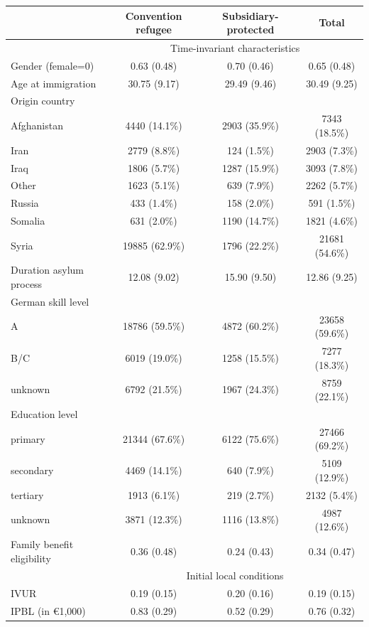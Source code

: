 \begin{tabular}{lccc}
\toprule
 & Convention refugee & Subsidiary-protected & Total \\
\midrule
\multicolumn{1}{l}{} & \multicolumn{3}{c}{Time-invariant characteristics} \\
Gender (female=0) & 0.63 (0.48) & 0.70 (0.46) & 0.65 (0.48) \\
Age at immigration & 30.75 (9.17) & 29.49 (9.46) & 30.49 (9.25) \\
Origin country & & & \\
\quad Afghanistan & 4440 (14.1\%) & 2903 (35.9\%) & 7343 (18.5\%) \\
\quad Iran & 2779 (8.8\%) & 124 (1.5\%) & 2903 (7.3\%) \\
\quad Iraq & 1806 (5.7\%) & 1287 (15.9\%) & 3093 (7.8\%) \\
\quad Other & 1623 (5.1\%) & 639 (7.9\%) & 2262 (5.7\%) \\
\quad Russia & 433 (1.4\%) & 158 (2.0\%) & 591 (1.5\%) \\
\quad Somalia & 631 (2.0\%) & 1190 (14.7\%) & 1821 (4.6\%) \\
\quad Syria & 19885 (62.9\%) & 1796 (22.2\%) & 21681 (54.6\%) \\
Duration asylum process & 12.08 (9.02) & 15.90 (9.50) & 12.86 (9.25) \\
German skill level & & & \\
\quad A & 18786 (59.5\%) & 4872 (60.2\%) & 23658 (59.6\%) \\
\quad B/C & 6019 (19.0\%) & 1258 (15.5\%) & 7277 (18.3\%) \\
\quad unknown & 6792 (21.5\%) & 1967 (24.3\%) & 8759 (22.1\%) \\
Education level & & & \\
\quad primary & 21344 (67.6\%) & 6122 (75.6\%) & 27466 (69.2\%) \\
\quad secondary & 4469 (14.1\%) & 640 (7.9\%) & 5109 (12.9\%) \\
\quad tertiary & 1913 (6.1\%) & 219 (2.7\%) & 2132 (5.4\%) \\
\quad unknown & 3871 (12.3\%) & 1116 (13.8\%) & 4987 (12.6\%) \\
Family benefit eligibility & 0.36 (0.48) & 0.24 (0.43) & 0.34 (0.47) \\
\multicolumn{1}{l}{} & \multicolumn{3}{c}{Initial local conditions} \\
IVUR & 0.19 (0.15) & 0.20 (0.16) & 0.19 (0.15) \\
IPBL (in €1,000) & 0.83 (0.29) & 0.52 (0.29) & 0.76 (0.32) \\

\end{tabular}
